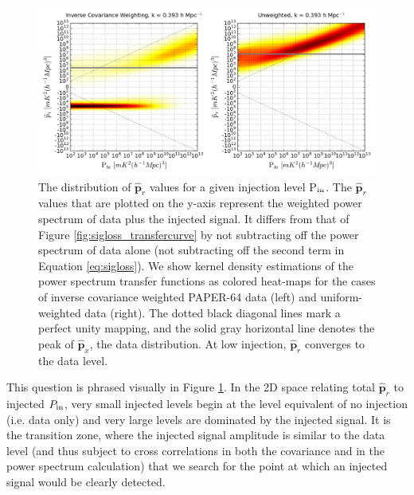 \documentclass[preprint2,numberedappendix,tighten]{aastex6}  %
\begin{document}
\begin{figure}[tp]
\centering
\includegraphics[width=\textwidth]{plots/method2_heatmap_posneg.png}
\caption{The distribution of $\widehat{\textbf{p}}_{r}$ values for a 
given injection level P$_{\rm in}$. The $\widehat{\textbf{p}}_{r}$ values that are plotted on the y-axis represent the weighted power spectrum of data plus the injected signal. It differs from that of Figure \ref{fig:sigloss_transfercurve} by not subtracting off the power spectrum of data alone (not subtracting off the second term in Equation \eqref{eq:sigloss}). We show kernel density estimations of the power spectrum transfer functions as colored heat-maps for the cases of inverse covariance weighted PAPER-64 data (left) and uniform-weighted data (right). The dotted black 
diagonal lines mark a perfect unity mapping, and the solid gray horizontal line denotes the peak of $\widehat{\textbf{p}}_{x}$, the data distribution. At low injection, $\widehat{\textbf{p}}_{r}$ converges to the data level.
}
\label{fig:Pr_vs_Pin}
\end{figure}  
  
This question is phrased visually in Figure \ref{fig:Pr_vs_Pin}. In the 2D space relating total $\widehat{\textbf{p}}_r$ to injected $P_{\rm in}$, very small injected levels begin at the level equivalent of no injection (i.e. data only) and very large levels are dominated by the injected signal. It is the transition zone, where the injected signal amplitude is similar to the data level (and thus subject to cross correlations in both the covariance and in the power spectrum calculation) that we search for the point at which an injected signal would be clearly detected.
  
\end{document}
